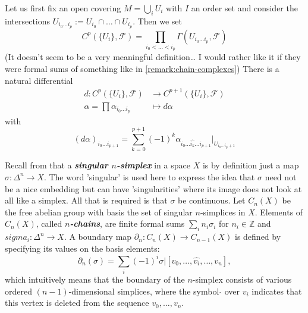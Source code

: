 \documentclass{article}
\newcommand{\Z}{\mathbb{Z}}
\newcommand{\Fc}{\mathcal{F}}
\begin{document}
Let us first fix an open covering $M=\bigcup_iU_i$ with $I$ an order set and consider the intersections $U_{i_0\ldots i_p}:=U_{i_0}\cap\ldots\cap U_{i_p}$. Then we set
\[C^p(\{U_i\},\Fc)=\prod_{i_0<\ldots<i_p}\Gamma(U_{i_0\ldots i_p},\Fc)\]
{\color{cyan}(It doesn't seem to be a very meaningful definition… I would rather like it if they were formal sums of something like in \cref{remark:chain-complexes})} There is a natural differential
\begin{align*}
	d:C^p(\{U_i\},\Fc)&\to C^{p+1}(\{U_i\},\Fc)\\
	\alpha=\prod\alpha_{i_0\ldots i_p}&\mapsto d\alpha
\end{align*}
with
\[(d\alpha)_{i_0\ldots i_{p+1}}=\sum_{k=0}^{p+1}(-1)^k\alpha_{i_0\ldots\widehat{i_k}\ldots i_{p+1}}|_{U_{i_0\ldots i_p+1}}\]
\begin{remark}\label{remark:chain-complexes}
	Recall from \cite{hatcher-at} that a \textbf{\textit{singular $n$-simplex}} in a space $X$ is by definition just a map $\sigma:\Delta^n\to X$. The word 'singular' is used here to express the idea that $\sigma$ need not be a nice embedding but can have 'singularities' where its image does not look at all like a simplex. All that is required is that $\sigma$ be continuous. Let $C_n(X)$ be the free abelian group with basis the set of singular $n$-simplices in $X$. Elements of $C_n(X)$, called \textbf{\textit{$n$-chains}}, are finite formal sums $\sum_in_i\sigma_i$ for $n_i\in\Z$ and $sigma_i:\Delta^n\to X$. A boundary map $\partial_n:C_n(X)\to C_{n-1}(X)$ is defined by specifying its values on the basis elements:
	\[\partial_n(\sigma)=\sum_i(-1)^i\sigma|[v_0,\ldots,\widehat{v_i},\ldots,v_n],\]
	which intuitively means that the boundary of the $n$-simplex consists of various ordered $(n-1)$-dimensional simplices, where the symbol $\hat{}$ over $v_i$ indicates that this vertex is deleted from the sequence $v_0,\ldots,v_n$.
	

\end{remark}
\end{document}
